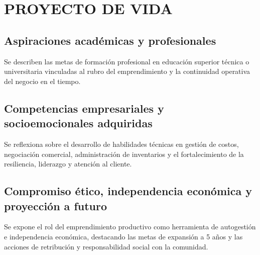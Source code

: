 \chapter{PROYECTO DE VIDA}
\label{chap:proyecto_vida}

\section{Aspiraciones académicas y profesionales}
\label{sec:aspiraciones_academicas}
Se describen las metas de formación profesional en educación superior técnica o universitaria vinculadas al rubro del emprendimiento y la continuidad operativa del negocio en el tiempo.

\section{Competencias empresariales y socioemocionales adquiridas}
\label{sec:competencias_adquiridas}
Se reflexiona sobre el desarrollo de habilidades técnicas en gestión de costos, negociación comercial, administración de inventarios y el fortalecimiento de la resiliencia, liderazgo y atención al cliente.

\section{Compromiso ético, independencia económica y proyección a futuro}
\label{sec:compromiso_etico}
Se expone el rol del emprendimiento productivo como herramienta de autogestión e independencia económica, destacando las metas de expansión a 5 años y las acciones de retribución y responsabilidad social con la comunidad.


